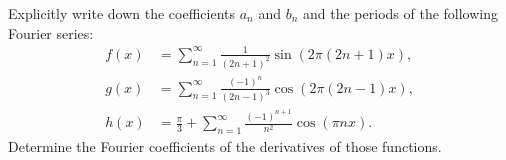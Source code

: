 \documentclass[11pt]{article}
\begin{document}
\begin{exercise}
    Explicitly write down the coefficients $a_n$ and $b_n$ and the periods of the following Fourier series:
    \begin{align*}
        f(x) &= \sum_{n=1}^{\infty} \frac{1}{(2n+1)^2}\sin(2\pi (2n+1) x),
        \\
        g(x) &= \sum_{n=1}^{\infty} \frac{(-1)^n}{(2n-1)^3}\cos(2\pi (2n-1) x),
        \\
        h(x) &= \frac \pi 3 + \sum_{n=1}^{\infty} \frac{(-1)^{n+1}}{n^2}\cos(\pi n x).
    \end{align*}
    Determine the Fourier coefficients of the derivatives of those functions. 
\end{exercise}
\end{document}

